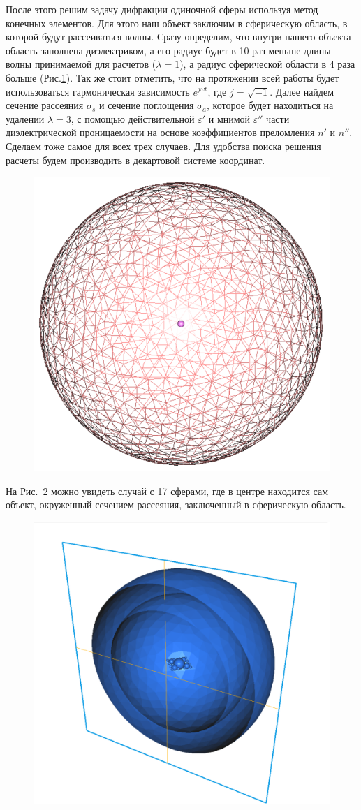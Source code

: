 \begin{flushleft}
	
После этого решим задачу дифракции одиночной сферы используя метод конечных элементов. Для этого наш объект заключим в сферическую область, в которой будут рассеиваться волны. Сразу определим, что внутри нашего объекта область заполнена диэлектриком, а его радиус будет в 10 раз меньше длины волны принимаемой для расчетов ($ \lambda = 1 $), а радиус сферической области в 4 раза больше (Рис.\ref{fig:ces1}). Так же стоит отметить, что на протяжении всей работы будет использоваться гармоническая зависимость $ e^{j \omega t} $, где $ j = \sqrt{-1} $. Далее найдем сечение рассеяния $ \sigma_s $ и сечение поглощения $ \sigma_a $, которое будет находиться на удалении $ \lambda = 3 $, с помощью действительной $ \varepsilon' $ и мнимой $ \varepsilon'' $ части диэлектрической проницаемости на основе коэффициентов преломления $ n' $ и $ n'' $. Сделаем тоже самое для всех трех случаев.  Для удобства поиска решения расчеты будем производить в декартовой системе координат. \\
\end{flushleft}

\begin{figure}[h!]
	\centering
	\includegraphics[width=0.5\linewidth]{ces1}
	\caption{}
	\label{fig:ces1}
\end{figure}
На Рис.~\ref{fig:q5} можно увидеть случай с 17 сферами, где в центре находится сам объект, окруженный сечением рассеяния, заключенный в сферическую область.\\
\begin{figure}[h!]
	\centering
	\includegraphics[width=0.6\linewidth]{3td_scattererAndOuterSpheres}
	\caption{}
	\label{fig:q5}
\end{figure}

